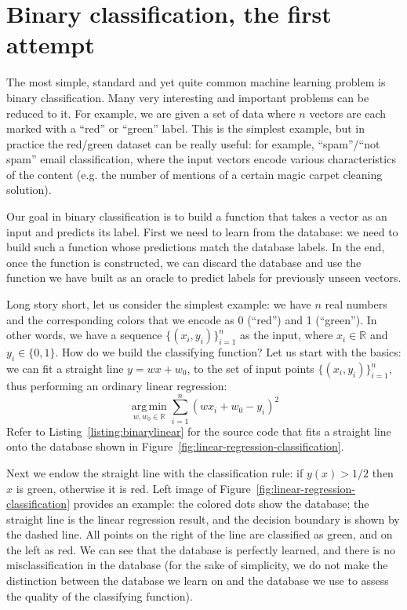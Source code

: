 \documentclass[notitlepage,oneside]{book}
\DeclareMathOperator*{\argmin}{arg\,min}
\begin{document}
\section{Binary classification, the first attempt}
\label{sec:binarylinear}
The most simple, standard and yet quite common machine learning problem is binary classification.
Many very interesting and important problems can be reduced to it.
For example, we are given a set of data where $n$ vectors are each marked with a ``red'' or ``green'' label.
This is the simplest example, but in practice the red/green dataset can be really useful: for example, ``spam''/``not spam'' email classification,
where the input vectors encode various characteristics of the content (e.g. the number of mentions of a certain magic carpet cleaning solution).

Our goal in binary classification is to build a function that takes a vector as an input and predicts its label.
First we need to learn from the database: we need to build such a function whose predictions match the database labels.
In the end, once the function is constructed, we can discard the database and use the function we have built as an oracle to predict labels for previously unseen vectors.

Long story short, let us consider the simplest example: we have $n$ real numbers and the corresponding colors that we encode as 0 (``red'') and 1 (``green'').
In other words, we have a sequence $\{(x_i, y_i)\}_{i=1}^n$ as the input, where $x_i\in\mathbb R$ and $y_i\in \{0,1\}$.
How do we build the classifying function? Let us start with the basics: we can fit a straight line $y=w x + w_0$,  to the set of input points $\{(x_i, y_i)\}_{i=1}^n$,
thus performing an ordinary linear regression:
$$
\argmin\limits_{w,w_0\in \mathbb R} \sum\limits_{i=1}^n (w x_i + w_0 - y_i)^2
$$
Refer to Listing~\ref{listing:binarylinear} for the source code that fits a straight line onto the database shown in Figure~\ref{fig:linear-regression-classification}.

Next we endow the straight line with the classification rule: if $y(x)>1/2$ then $x$ is green, otherwise it is red.
Left image of Figure~\ref{fig:linear-regression-classification} provides an example: the colored dots show the database; the straight line is the linear regression result,
and the decision boundary is shown by the dashed line. All points on the right of the line are classified as green, and on the left as red.
We can see that the database is perfectly learned, and there is no misclassification in the database
(for the sake of simplicity, we do not make the distinction between the database we learn on and the database we use to assess the quality of the classifying function).
\end{document}
